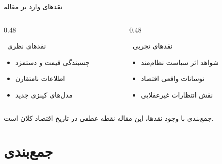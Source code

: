 \documentclass[aspectratio=169,11pt]{beamer}
\begin{document}
\begin{frame}{نقدهای وارد بر مقاله}
  \begin{LTR}
  \begin{columns}[T]
    \begin{column}{0.48\textwidth}
      \begin{RTL}
      \begin{alertblock}{\faExclamationTriangle\ نقدهای نظری}
        \begin{itemize}
          \item چسبندگی قیمت و دستمزد
          \item اطلاعات نامتقارن
          \item مدل‌های کینزی جدید
        \end{itemize}
      \end{alertblock}
      \end{RTL}
    \end{column}
    \hfill
    \begin{column}{0.48\textwidth}
      \begin{RTL}
      \begin{alertblock}{\faExclamationTriangle\ نقدهای تجربی}
        \begin{itemize}
          \item شواهد اثر سیاست نظام‌مند
          \item نوسانات واقعی اقتصاد
          \item نقش انتظارات غیرعقلایی
        \end{itemize}
      \end{alertblock}
      \end{RTL}
    \end{column}
  \end{columns}
  \end{LTR}
  \vspace{0.3cm}
  \begin{block}{جمع‌بندی}
    \centering
    با وجود نقدها، این مقاله نقطه عطفی در تاریخ اقتصاد کلان است.
  \end{block}
\end{frame}

\section{جمع‌بندی}
\end{document}
